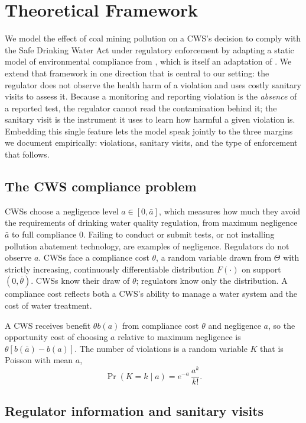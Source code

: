 \documentclass{article}
\begin{document}
\section{Theoretical Framework}

We model the effect of coal mining pollution on a CWS's decision to comply with the Safe Drinking Water Act under regulatory enforcement by adapting a static model of environmental compliance from \cite{kang2021understanding}, which is itself an adaptation of \cite{mookherjee1994marginal}. We extend that framework in one direction that is central to our setting: the regulator does not observe the health harm of a violation and uses costly sanitary visits to assess it. Because a monitoring and reporting violation is the \emph{absence} of a reported test, the regulator cannot read the contamination behind it; the sanitary visit is the instrument it uses to learn how harmful a given violation is. Embedding this single feature lets the model speak jointly to the three margins we document empirically: violations, sanitary visits, and the type of enforcement that follows.

\subsection{The CWS compliance problem}

CWSs choose a negligence level $a \in [0,\bar{a}]$, which measures how much they avoid the requirements of drinking water quality regulation, from maximum negligence $\bar{a}$ to full compliance $0$. Failing to conduct or submit tests, or not installing pollution abatement technology, are examples of negligence. Regulators do not observe $a$. CWSs face a compliance cost $\theta$, a random variable drawn from $\Theta$ with strictly increasing, continuously differentiable distribution $F(\cdot)$ on support $(0,\bar{\theta})$. CWSs know their draw of $\theta$; regulators know only the distribution. A compliance cost reflects both a CWS's ability to manage a water system and the cost of water treatment.

A CWS receives benefit $\theta b(a)$ from compliance cost $\theta$ and negligence $a$, so the opportunity cost of choosing $a$ relative to maximum negligence is $\theta[b(\bar{a})-b(a)]$. The number of violations is a random variable $K$ that is Poisson with mean $a$,
\[
\Pr(K=k\mid a) = e^{-a}\,\frac{a^k}{k!}.
\]

\subsection{Regulator information and sanitary visits}
\end{document}
